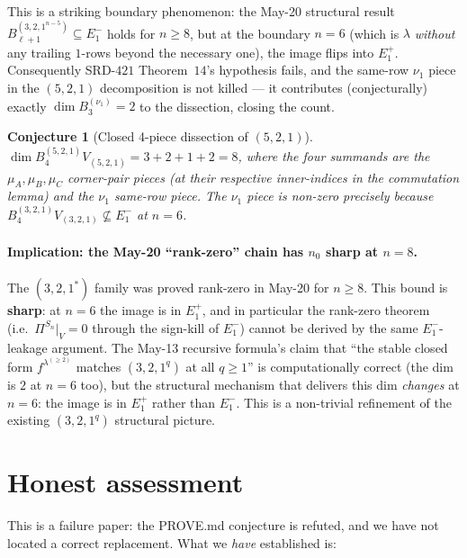 \documentclass[11pt]{article}
\newtheorem{conjecture}[theorem]{Conjecture}
\theoremstyle{definition}
\begin{document}
This is a striking boundary phenomenon: the May-20 structural result
$B^{(3, 2, 1^{n-5})}_{\ell + 1} \subseteq E_1^-$ holds for $n \ge 8$,
but at the boundary $n = 6$ (which is $\lambda$ \emph{without} any
trailing $1$-rows beyond the necessary one), the image flips into
$E_1^+$.  Consequently SRD-$421$ Theorem~$14$'s hypothesis fails, and
the same-row $\nu_1$ piece in the $(5, 2, 1)$ decomposition is not
killed --- it contributes (conjecturally) exactly $\dim B^{(\nu_1)}_3
= 2$ to the dissection, closing the count.

\begin{conjecture}[Closed 4-piece dissection of $(5, 2, 1)$]
$\dim B^{(5, 2, 1)}_4 V_{(5, 2, 1)} = 3 + 2 + 1 + 2 = 8$, where the
four summands are the $\mu_A, \mu_B, \mu_C$ corner-pair pieces (at
their respective inner-indices in the commutation lemma) and the
$\nu_1$ same-row piece.  The $\nu_1$ piece is non-zero precisely
because $B^{(3, 2, 1)}_4 V_{(3, 2, 1)} \not\subseteq E_1^-$ at $n = 6$.
\end{conjecture}

\paragraph{Implication: the May-20 ``rank-zero'' chain has $n_0$
sharp at $n = 8$.}
The $(3, 2, 1^*)$ family was proved rank-zero in May-20 for $n \ge 8$.
This bound is \textbf{sharp}: at $n = 6$ the image is in $E_1^+$, and
in particular the rank-zero theorem (i.e.\ $\Pi^{S_n}|_{V} = 0$
through the sign-kill of $E_1^-$) cannot be derived by the same
$E_1^-$-leakage argument.  The May-13 recursive formula's claim that
``the stable closed form $f^{\lambda^{(\ge 2)}}$ matches $(3, 2, 1^q)$
at all $q \ge 1$'' is computationally correct (the dim is $2$ at
$n = 6$ too), but the structural mechanism that delivers this dim
\emph{changes} at $n = 6$: the image is in $E_1^+$ rather than
$E_1^-$.  This is a non-trivial refinement of the existing
$(3, 2, 1^q)$ structural picture.

\section{Honest assessment}

This is a failure paper: the PROVE.md conjecture is refuted, and we
have not located a correct replacement.  What we \emph{have}
established is:
\end{document}
